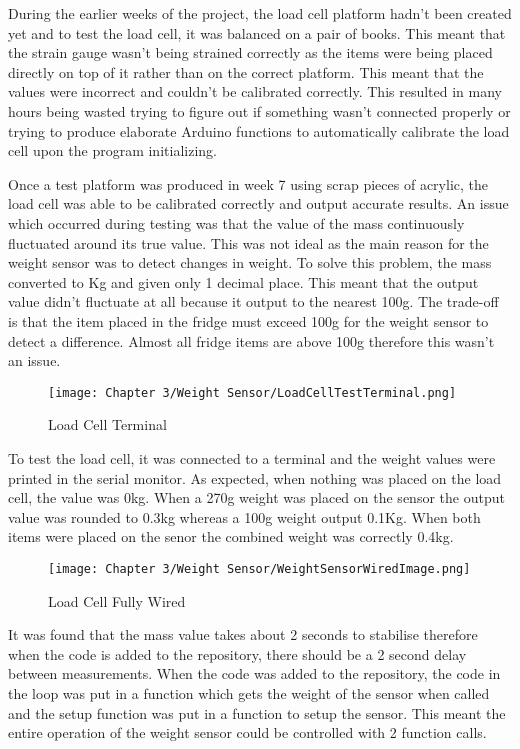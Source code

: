 During the earlier weeks of the project, the load cell platform hadn't been created yet and to test the load cell, it was balanced on a pair of books.
This meant that the strain gauge wasn't being strained correctly as the items were being placed directly on top of it rather than on the correct platform.
This meant that the values were incorrect and couldn't be calibrated correctly.
This resulted in many hours being wasted trying to figure out if something wasn't connected properly or trying to produce elaborate Arduino functions to automatically calibrate the load cell upon the program initializing.

Once a test platform was produced in week 7 using scrap pieces of acrylic, the load cell was able to be calibrated correctly and output accurate results.
An issue which occurred during testing was that the value of the mass continuously fluctuated around its true value.
This was not ideal as the main reason for the weight sensor was to detect changes in weight.
To solve this problem, the mass converted to Kg and given only 1 decimal place.
This meant that the output value didn't fluctuate at all because it output to the nearest 100g.
The trade-off is that the item placed in the fridge must exceed 100g for the weight sensor to detect a difference.
Almost all fridge items are above 100g therefore this wasn't an issue.

\begin{figure}[H]        
    \centering
    \texttt{[image: Chapter 3/Weight Sensor/LoadCellTestTerminal.png]}
    \caption{Load Cell Terminal}
    \label{fig:lcterminal}
\end{figure} 

To test the load cell, it was connected to a terminal and the weight values were printed in the serial monitor.
As expected, when nothing was placed on the load cell, the value was 0kg.
When a 270g weight was placed on the sensor the output value was rounded to 0.3kg whereas a 100g weight output 0.1Kg.
When both items were placed on the senor the combined weight was correctly 0.4kg.

\begin{figure}[H]        
    \centering
    \texttt{[image: Chapter 3/Weight Sensor/WeightSensorWiredImage.png]}
    \caption{Load Cell Fully Wired}
    \label{fig:lcwired}
\end{figure} 

It was found that the mass value takes about 2 seconds to stabilise therefore when the code is added to the repository, there should be a 2 second delay between measurements.
When the code was added to the repository, the code in the loop was put in a function which gets the weight of the sensor when called and the setup function was put in a function to setup the sensor.
This meant the entire operation of the weight sensor could be controlled with 2 function calls.

